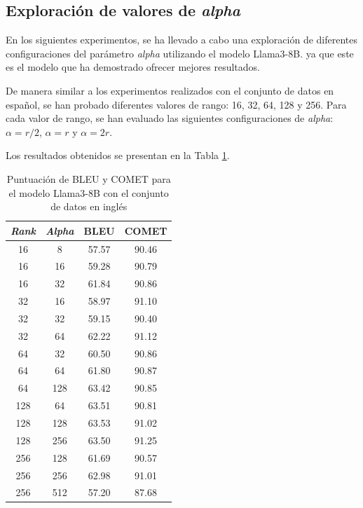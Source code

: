 \documentclass[11pt,spanish,listoffigures,listoftables]{tfgetsinf}
\begin{document}

\subsection{Exploración de valores de \textit{alpha}}

En los siguientes experimentos, se ha llevado a cabo una exploración de diferentes configuraciones del parámetro \textit{alpha} utilizando el modelo Llama3-8B. ya que este es el modelo que ha demostrado ofrecer mejores resultados.

De manera similar a los experimentos realizados con el conjunto de datos en español, se han probado diferentes valores de rango: 16, 32, 64, 128 y 256. Para cada valor de rango, se han evaluado las siguientes configuraciones de \textit{alpha}: $\alpha = r/2$, $\alpha = r$ y $\alpha = 2r$.

Los resultados obtenidos se presentan en la Tabla \ref{tab: Llama exploración de alpha inglés}.

\begin{table}[!h]
\caption{Puntuación de BLEU y COMET para el modelo Llama3-8B con el conjunto de datos en inglés}
\begin{center}
\begin{tabular}{ c c | c c }
	\hline
	\textit{Rank} & \textit{Alpha} & BLEU & COMET \\
	\hline
	\hline
	16 & 8 & 57.57 & 90.46 \\
	16 & 16 & 59.28 & 90.79 \\
	16 & 32 & 61.84 & 90.86 \\
	\hline
	32 & 16 & 58.97 & 91.10 \\
	32 & 32 & 59.15 & 90.40 \\
	32 & 64 &  62.22 & 91.12 \\
	\hline
	64 & 32 & 60.50 & 90.86\\
	64 & 64 & 61.80 & 90.87\\
	64 & 128 & 63.42 & 90.85\\
	\hline
	128 & 64 & 63.51 & 90.81\\
	128 & 128 & 63.53 & 91.02\\
	128 & 256 & 63.50 & 91.25\\
	\hline
	256 & 128 & 61.69 & 90.57\\
	256 & 256 & 62.98 & 91.01\\
	256 & 512 & 57.20 & 87.68\\	

\end{tabular}
\end{center}
\label{tab: Llama exploración de alpha inglés}
\end{table}
\end{document}
